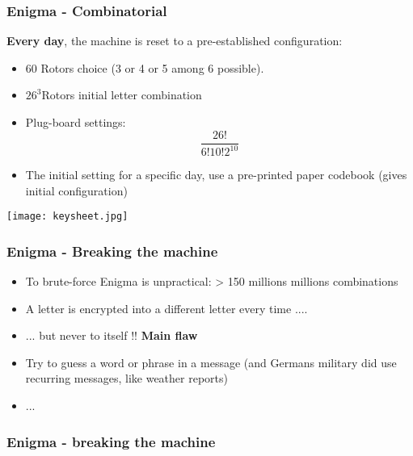 \documentclass[
hyperref={pdfpagelabels=false}
,xcolor=table
]
{beamer}
\begin{document}
\begin{frame}
  \frametitle{Enigma - Combinatorial}
  \textbf{Every day}, the machine is reset to a pre-established configuration:
  \begin{itemize}
  \item $60$ Rotors choice (3 or 4 or 5 among 6 possible). 
  \item  $26^3$Rotors initial letter combination
  \item Plug-board settings: $$\frac{26!}{6!10!2^{10}}$$
  \item The initial setting for a specific day, use a pre-printed
    paper codebook (gives initial configuration)
  \end{itemize}

  \begin{center}
    \texttt{[image: keysheet.jpg]}
  \end{center}
  
\end{frame}


\begin{frame}
  \frametitle{Enigma - Breaking the machine}

  \begin{itemize}
  \item To brute-force Enigma is unpractical: > 150 millions millions combinations
  \item A letter is encrypted into a different letter every time ....
  \item ... but never to itself !! \textbf{Main flaw}
  \item Try to guess a word or phrase in a message (and Germans military did use recurring messages, like weather reports)
  \item ...
  \end{itemize}

\end{frame}

\begin{frame} 
  \frametitle{Enigma - breaking the machine}
  \begin{center}
  \end{center}
\end{frame}
\end{document}
